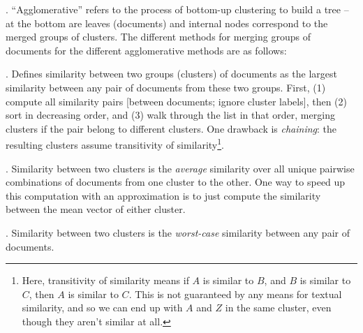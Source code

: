 \documentclass[11pt]{article}
\begin{document}
\myspace
\p {}. ``Agglomerative'' refers to the process of bottom-up clustering to build a tree -- at the bottom are leaves (documents) and internal nodes correspond to the merged groups of clusters. The different methods for merging groups of documents for the different agglomerative methods are as follows:
\begin{compactitem}
	\item {}. Defines similarity between two groups (clusters) of documents as the largest similarity between any pair of documents from these two groups. First, (1) compute all similarity pairs [between documents; ignore cluster labels], then (2) sort in decreasing order, and (3) walk through the list in that order, merging clusters if the pair belong to different clusters. One drawback is \textit{chaining}: the resulting clusters assume transitivity of similarity\footnote{Here, transitivity of similarity means if $A$ is similar to $B$, and $B$ is similar to $C$, then $A$ is similar to $C$. This is not guaranteed by any means for textual similarity, and so we can end up with $A$ and $Z$ in the same cluster, even though they aren't similar at all. }.
	
	\item {}. Similarity between two clusters is the \textit{average} similarity over all unique pairwise combinations of documents from one cluster to the other. One way to speed up this computation with an approximation is to just compute the similarity between the mean vector of either cluster. 
	
	\item {}. Similarity between two clusters is the \textit{worst-case} similarity between any pair of documents. 
\end{compactitem}
\end{document}
